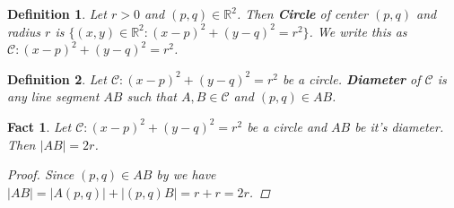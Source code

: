 \documentclass[a4paper,12pt]{report}
\newtheorem{definition}{Definition}
\newtheorem{fact}{Fact}
\begin{document}
\begin{definition}
  Let $r>0$ and $(p,q)\in\mathbb{R}^2$. Then \textbf{Circle} of center $(p,q)$ and radius $r$ is $\{(x,y)\in\mathbb{R}^2:{(x-p)}^2+{(y-q)}^2=r^2\}$. We write this as $\mathcal{C}:(x-p)^2+(y-q)^2=r^2$.
\end{definition}

\begin{definition}
  Let $\mathcal{C}:(x-p)^2+(y-q)^2=r^2$ be a circle. \textbf{Diameter} of $\mathcal{C}$ is any line segment $AB$ such that $A,B\in \mathcal{C}$ and $(p,q)\in AB$.
\end{definition}

\begin{fact}\label{Diameter VS Radius}
  Let $\mathcal{C}:{(x-p)}^2+{(y-q)}^2=r^2$ be a circle and $AB$ be it’s diameter. Then $|AB|=2r$.
\begin{proof}
  Since $(p,q)\in AB$ by  we have $|AB|=|A(p,q)|+|(p,q)B|=r+r=2r$.
\end{proof}
\end{fact}
\end{document}
